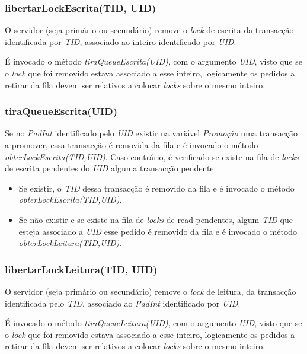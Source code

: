 \subsubsection{libertarLockEscrita(TID, UID)}

O servidor (seja primário ou secundário) remove o \textit{lock} de escrita da transacção identificada por \textit{TID}, associado ao inteiro identificado por \textit{UID}.

É invocado o método \textit{tiraQueueEscrita(UID)}, com o argumento \textit{UID}, visto que se o \textit{lock} que foi removido estava associado a esse inteiro, logicamente os pedidos a retirar da fila devem ser relativos a colocar \textit{locks} sobre o mesmo inteiro.

\subsubsection{tiraQueueEscrita(UID)}

Se no \textit{PadInt} identificado pelo \textit{UID} existir na variável \textit{Promoção} uma transacção a promover, essa transacção é removida da fila e é invocado o método \textit{obterLockEscrita(TID,UID)}. Caso contrário, é verificado se existe na fila de \textit{locks} de escrita pendentes do \textit{UID} alguma transacção pendente:
\begin{itemize}
	\item Se existir, o \textit{TID} dessa transacção é removido da fila e é invocado o método \textit{obterLockEscrita(TID,UID)}. 
	\item Se não existir e se existe na fila de \textit{locks} de read pendentes, algum \textit{TID}  que esteja associado a \textit{UID} esse pedido é removido da fila e é invocado o método \textit{obterLockLeitura(TID,UID)}.
\end{itemize}

\subsubsection{libertarLockLeitura(TID, UID)}

O servidor (seja primário ou secundário) remove o \textit{lock} de leitura, da transacção identificada pelo \textit{TID}, associado ao \textit{PadInt} identificado por \textit{UID}.

É invocado o método \textit{tiraQueueLeitura(UID)}, com o argumento \textit{UID}, visto que se o \textit{lock} que foi removido estava associado a esse inteiro, logicamente os pedidos a retirar da fila devem ser relativos a colocar \textit{locks} sobre o mesmo inteiro.

